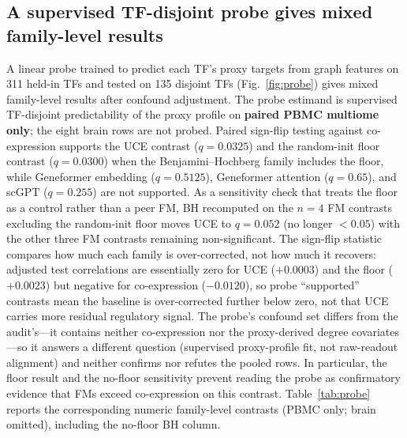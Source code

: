 \documentclass[fleqn,10pt,lineno]{wlpeerj}
\begin{document}
\subsection{A supervised TF-disjoint probe gives mixed family-level results}
A linear probe trained to predict each TF's proxy targets from graph features on 311 held-in TFs
and tested on 135 disjoint TFs (Fig.~\ref{fig:probe}) gives mixed family-level results after confound
adjustment. The probe estimand is supervised TF-disjoint predictability of the proxy profile on
\textbf{paired PBMC multiome only}; the eight brain rows are not probed. Paired sign-flip testing
against co-expression supports the UCE contrast ($q=0.0325$) and the random-init floor contrast
($q=0.0300$) when the Benjamini--Hochberg family includes the floor, while Geneformer embedding
($q=0.5125$), Geneformer attention ($q=0.65$), and scGPT ($q=0.255$) are not supported. As a
sensitivity check that treats the floor as a control rather than a peer FM, BH recomputed on the
$n=4$ FM contrasts excluding the random-init floor moves UCE to $q=0.052$ (no longer $<0.05$) with
the other three FM contrasts remaining non-significant. The sign-flip statistic compares how
much each family is over-corrected, not how much it recovers: adjusted test correlations are
essentially zero for UCE ($+0.0003$) and the floor ($+0.0023$) but negative for co-expression
($-0.0120$), so probe ``supported'' contrasts mean the baseline is over-corrected further below zero, not
that UCE carries more residual regulatory signal. The probe's confound set differs from the
audit's---it contains neither co-expression nor the proxy-derived degree covariates---so it answers a
different question (supervised proxy-profile fit, not raw-readout alignment) and neither confirms nor
refutes the pooled rows. In particular, the floor result and the no-floor sensitivity prevent reading
the probe as confirmatory evidence that FMs exceed co-expression on this contrast.
Table~\ref{tab:probe} reports the corresponding numeric family-level contrasts (PBMC only; brain
omitted), including the no-floor BH column.
\end{document}
